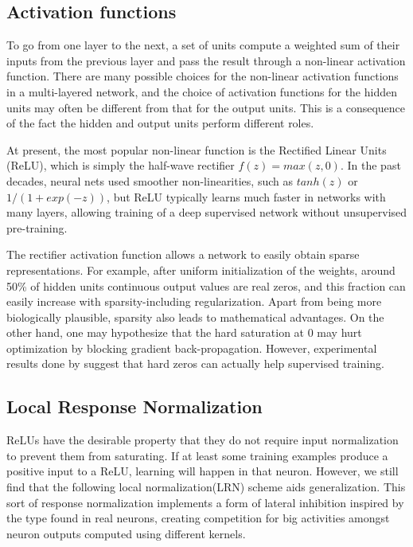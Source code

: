 \subsection{Activation functions}
To go from one layer to the next, a set of units compute a weighted sum of their inputs from the previous layer and pass the result through a non-linear activation function\cite{lecun2015deep}. There are many possible choices for the non-linear activation functions in a multi-layered network, and the choice of activation functions for the hidden units may often be different from that for the output units. This is a consequence of the fact the hidden and output units perform different roles\cite{bishop1995neural}. 

\indent At present, the most popular non-linear function is the Rectified Linear Units (ReLU), which is simply the half-wave rectifier $f(z) = max(z, 0)$. In the past decades, neural nets used smoother non-linearities, such as $tanh(z)$ or $1/(1+ exp(-z))$, but ReLU typically learns much faster in networks with many layers, allowing training of a deep supervised network without unsupervised pre-training\cite{lecun2015deep}. 

\indent The rectifier activation function allows a network to easily obtain sparse representations. For example, after uniform initialization of the weights, around 50\% of hidden units continuous output values are real zeros, and this fraction can easily increase with sparsity-including regularization. Apart from being more biologically plausible, sparsity also leads to mathematical advantages. On the other hand, one may hypothesize that the hard saturation at 0 may hurt optimization by blocking gradient back-propagation. However, experimental results done by\citeauthor{glorot2011deep} suggest that hard zeros can actually help supervised training\cite{glorot2011deep}.  

\subsection{Local Response Normalization}

ReLUs have the desirable property that they do not require input normalization to prevent them from saturating. If at least some training examples produce a positive input to a ReLU, learning will happen in that neuron. However, we still find that the following local normalization(LRN) scheme aids generalization. This sort of response normalization implements a form of lateral inhibition  inspired by the type found in real neurons, creating competition for big activities amongst neuron outputs computed using different kernels\cite{krizhevsky2012imagenet}.

